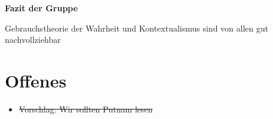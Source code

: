 \documentclass[a4paper, emulatestandardclasses]{scrartcl}
\begin{document}
\noindent\textbf{Fazit der Gruppe}

Gebrauchstheorie der Wahrheit und Kontextualismus sind von allen gut nachvollziehbar


\section*{Offenes}

\begin{itemize}
  \item \sout{Vorschlag: Wir sollten Putnam lesen}
\end{itemize}
\end{document}
